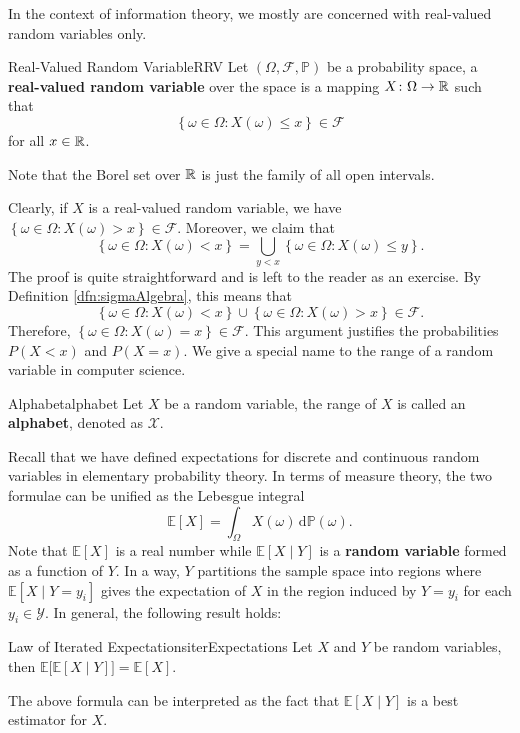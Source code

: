\documentclass[math, code]{amznotes}
\theoremstyle{remark}
\renewcommand{\d}{\mathrm{d}}
\begin{document}
In the context of information theory, we mostly are concerned with real-valued random variables only.
\begin{dfnbox}{Real-Valued Random Variable}{RRV}
    Let $\left(\Omega, \mathcal{F}, \mathbb{P}\right)$ be a probability space, a {\color{red} \textbf{real-valued random variable}} over the space is a mapping $X \colon \Omega \to \mathbb{R}$ such that 
    \begin{equation*}
        \left\{\omega \in \Omega \colon X\left(\omega\right) \leq x\right\} \in \mathcal{F}
    \end{equation*}
    for all $x \in \mathbb{R}$.
\end{dfnbox}
Note that the Borel set over $\mathbb{R}$ is just the family of all open intervals. 

Clearly, if $X$ is a real-valued random variable, we have $\left\{\omega \in \Omega \colon X\left(\omega\right) > x\right\} \in \mathcal{F}$. Moreover, we claim that 
\begin{equation*}
    \left\{\omega \in \Omega \colon X\left(\omega\right) < x\right\} = \bigcup_{y < x}\left\{\omega \in \Omega \colon X\left(\omega\right) \leq y\right\}.
\end{equation*}
The proof is quite straightforward and is left to the reader as an exercise. By Definition \ref{dfn:sigmaAlgebra}, this means that 
\begin{equation*}
    \left\{\omega \in \Omega \colon X\left(\omega\right) < x\right\} \cup \left\{\omega \in \Omega \colon X\left(\omega\right) > x\right\} \in \mathcal{F}.
\end{equation*}
Therefore, $\left\{\omega \in \Omega \colon X\left(\omega\right) = x\right\} \in \mathcal{F}$. This argument justifies the probabilities $P\left(X < x\right)$ and $P\left(X = x\right)$. We give a special name to the range of a random variable in computer science.
\begin{dfnbox}{Alphabet}{alphabet}
    Let $X$ be a random variable, the range of $X$ is called an {\color{red} \textbf{alphabet}}, denoted as $\mathcal{X}$.
\end{dfnbox}
Recall that we have defined expectations for discrete and continuous random variables in elementary probability theory. In terms of measure theory, the two formulae can be unified as the Lebesgue integral
\begin{equation*}
    \mathbb{E}[X] = \int_{\Omega}\!X\left(\omega\right)\,\d\mathbb{P}\left(\omega\right).
\end{equation*}
Note that $\mathbb{E}[X]$ is a real number while $\mathbb{E}[X \mid Y]$ is a \textbf{random variable} formed as a function of $Y$. In a way, $Y$ partitions the sample space into regions where $\mathbb{E}[X \mid Y = y_i]$ gives the expectation of $X$ in the region induced by $Y = y_i$ for each $y_i \in \mathcal{Y}$. In general, the following result holds:
\begin{thmbox}{Law of Iterated Expectations}{iterExpectations}
    Let $X$ and $Y$ be random variables, then $\mathbb{E}\bigl[\mathbb{E}[X \mid Y]\bigr] = \mathbb{E}[X]$.
\end{thmbox}
The above formula can be interpreted as the fact that $\mathbb{E}[X \mid Y]$ is a best estimator for $X$.
\end{document}

